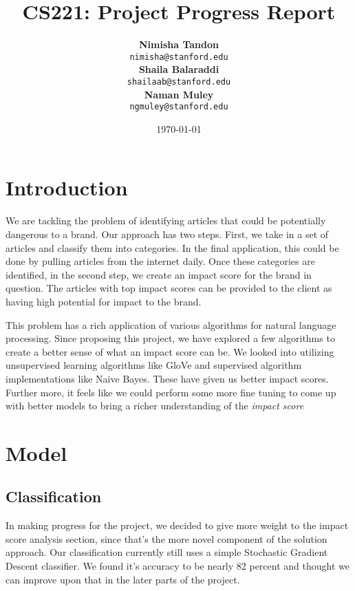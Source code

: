 \documentclass{article}
\title{CS221: Project Progress Report} %
\author{	\textbf{Nimisha Tandon}\\  \texttt{nimisha@stanford.edu} \\
		\textbf{Shaila Balaraddi}\\  \texttt{shailaab@stanford.edu} \\
		\textbf{Naman Muley}\\      \texttt{ngmuley@stanford.edu}}
\date{\today} %
\begin{document}
\maketitle %


\section{Introduction} %

We are tackling the problem of identifying articles that could be potentially dangerous to a brand. Our approach has two steps. First, we take in a set of articles and classify them into categories. In the final application, this could be done by pulling articles from the internet daily. Once these categories are identified, in the second step, we create an impact score for the brand in question. The articles with top impact scores can be provided to the client as having high potential for impact to the brand.

This problem has a rich application of various algorithms for natural language processing. Since proposing this project, we have explored a few algorithms to create a better sense of what an impact score can be. We looked into utilizing unsupervised learning algorithms like GloVe and supervised algorithm implementations like Naive Bayes. These have given us better impact scores. Further more, it feels like we could perform some more fine tuning to come up with better models to bring a richer understanding of the \textit{impact score}

\maketitle %
\section{Model} %

\subsection {Classification}
In making progress for the project, we decided to give more weight to the impact score analysis section, since that's the more novel component of the solution approach. Our classification currently still uses a simple Stochastic Gradient Descent classifier. We found it's accuracy to be nearly 82 percent and thought we can improve upon that in the later parts of the project.
\end{document}

